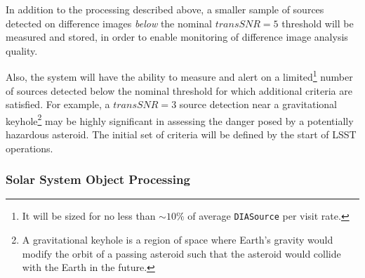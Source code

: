 \documentclass[12pt]{article}
\newcommand{\code}[1]{\texttt{#1}}
\newcommand{\DIASource}{\code{DIASource}\xspace}
\newcommand{\transSNR}{5\xspace}
\newcommand{\req}[1]{\marginpar{\tiny #1}}
\newcommand{\dmreq}[1]{\req{DMS-REQ-#1}}
\begin{document}
In addition to the processing described above, a smaller sample of sources detected on difference images \emph{below} the nominal $transSNR = \transSNR$ \req{transSNR} threshold will be measured and stored, in order to enable monitoring of difference image analysis quality.\dmreq{0270}

Also, the system will have the ability to measure and alert on a limited\footnote{It will be sized for no less than $\sim 10\%$ of average \DIASource per visit rate.} number of sources detected below the nominal threshold for which additional criteria are satisfied. For example, a $transSNR = 3$ source detection near a gravitational keyhole\footnote{
A gravitational keyhole is a region of space where Earth's gravity would modify the orbit of a passing asteroid
such that the asteroid would collide with the Earth in the future.}
may be highly significant in assessing the danger posed by a potentially hazardous asteroid.
The initial set of criteria will be defined by the start of LSST operations.

\subsubsection{Solar System Object Processing}
\label{sec:ssProcessing}
\end{document}
